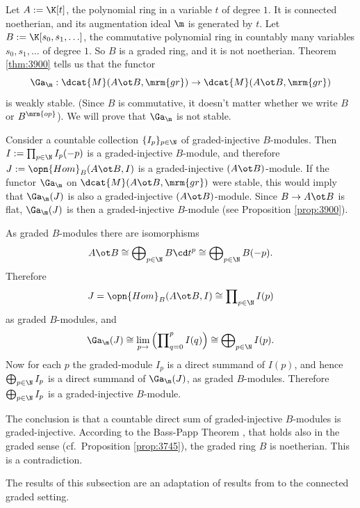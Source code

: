 \begin{exa} \label{exa:4077}
Let $A := \K[t]$, the polynomial ring in a variable $t$ of degree $1$. It is 
connected noetherian, and its augmentation ideal $\m$ is generated by $t$. 
Let $B := \K[s_0, s_1, \ldots]$, the commutative polynomial ring in countably 
many variables $s_0, s_1, \ldots$ of degree $1$. So $B$ is a graded ring, 
and it is not noetherian. Theorem \ref{thm:3900} tells us that the functor 
\[ \Ga_{\m} : \dcat{M}(A \ot B, \mrm{gr}) \to \dcat{M}(A \ot B, \mrm{gr}) \]
is weakly stable. (Since $B$ is commutative, it doesn't matter whether we write 
$B$ or $B^{\mrm{op}}$). 
We will prove that $\Ga_{\m}$ is not stable. 

Consider a countable collection $\{ I_p \}_{p \in \N}$ of graded-injective 
$B$-modules. Then 
$I := \prod_{p \in \N} I_p(-p)$
is a graded-injective $B$-module, and 
therefore $J := \opn{Hom}_B(A \ot B, I)$ is a graded-injective 
$(A \ot B)$-module. If the functor $\Ga_{\m}$ on 
$\dcat{M}(A \ot B, \mrm{gr})$ were stable, this would imply 
that $\Ga_{\m}(J)$ is also a graded-injective $(A \ot B)$-module. Since 
$B \to A \ot B$ is flat, $\Ga_{\m}(J)$ is then a graded-injective $B$-module
(see Proposition \ref{prop:3900}). 

As graded $B$-modules there are isomorphisms
\[ A \ot B \cong \bigoplus\nolimits_{p \in \N} B \cd t^p 
\cong \bigoplus\nolimits_{p \in \N} B(-p) . \]
Therefore 
\[ J = \opn{Hom}_B(A \ot B, I) \cong \prod\nolimits_{p \in \N} I(p)  \]
as graded $B$-modules, and 
\[ \Ga_{\m}(J) \cong \lim_{p \to} \, 
\Bigl( \prod\nolimits_{q = 0}^p I(q) \Bigr) \cong 
\bigoplus\nolimits_{p \in \N} I(p) . \]
Now for each $p$ the graded-module $I_p$ is a direct summand of $I(p)$, and 
hence $\bigoplus_{p \in \N} I_p$ is a direct summand of $\Ga_{\m}(J)$, as 
graded $B$-modules. Therefore $\bigoplus_{p \in \N} I_p$ is a graded-injective 
$B$-module. 

The conclusion is that a countable direct sum of graded-injective $B$-modules 
is graded-injective. According to the Bass-Papp Theorem 
\cite[Theorem 3.46]{Lam}, that holds also in the graded sense (cf.\ Proposition 
\ref{prop:3745}), the graded ring $B$ is 
noetherian. This is a contradiction. 
\end{exa}



\label{subsec:repr-der-tors}

The results of this subsection are an adaptation of results from 
\cite[Section 7]{VyYe} to the connected graded setting. 

